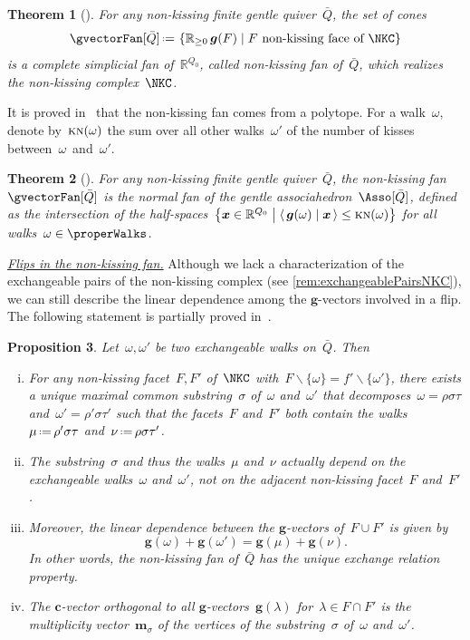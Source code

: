 \documentclass{amsart}
\newtheorem{theorem}{Theorem}[section]
\newtheorem{proposition}[theorem]{Proposition}
\theoremstyle{definition}
\newcommand{\R}{\mathbb{R}} %
\renewcommand{\b}[1]{{\boldsymbol{#1}}} %
\newcommand{\set}[2]{\left\{ #1 \;\middle|\; #2 \right\}} %
\newcommand{\ssm}{\smallsetminus} %
\newcommand{\dotprod}[2]{\left\langle \, #1 \; \middle| \; #2 \, \right\rangle} %
\newcommand{\eqdef}{\mbox{\,\raisebox{0.2ex}{\scriptsize\ensuremath{\mathrm:}}\ensuremath{=}\,}} %
\newcommand{\darkblue}{\color{darkblue}} %
\newcommand{\defn}[1]{\textsl{\darkblue #1}} %
\newcommand{\para}[1]{\medskip\noindent\uline{\textit{#1.}}} %
\newcommand{\multiplicityVector}{\b{m}} %
\newcommand{\gvector}[1]{\b{g}(#1)} %
\newcommand{\gvectors}[1]{\b{g}(#1)} %
\newcommand{\quiver}{\bar Q} %
\newcommand{\KN}{\textsc{kn}} %
\begin{document}
\begin{theorem}[{\cite[Thm.~4.17]{PaluPilaudPlamondon-nonkissing}}]
For any non-kissing finite gentle quiver~$\quiver$, the set of cones
\[
\gvectorFan[\quiver] \eqdef \set{\R_{\ge 0} \, \gvectors{F}}{F \text{ non-kissing face of } \NKC}
\]
is a complete simplicial fan of~$\R^{Q_0}$, called \defn{non-kissing fan} of~$\quiver$, which realizes the non-kissing complex~$\NKC$.
\end{theorem}

It is proved in~\cite[Thm.~4.27]{PaluPilaudPlamondon-nonkissing} that the non-kissing fan comes from a polytope.
For a walk~$\omega$, denote by~$\KN(\omega)$ the sum over all other walks~$\omega'$ of the number of kisses between~$\omega$~and~$\omega'$.

\begin{theorem}[{\cite[Thm.~4.27]{PaluPilaudPlamondon-nonkissing}}]
For any non-kissing finite gentle quiver~$\quiver$, the non-kissing fan~$\gvectorFan[\quiver]$ is the normal fan of the gentle associahedron~$\Asso[\quiver]$, defined as the intersection of the half-spaces~$\set{\b{x} \in \R^{Q_0}}{\dotprod{\gvector{\omega}}{\b{x}} \le \KN(\omega)}$ for all walks~$\omega \in \properWalks$.
\end{theorem}

\para{Flips in the non-kissing fan}
%
Although we lack a characterization of the exchangeable pairs of the non-kissing complex (see \cref{rem:exchangeablePairsNKC}), we can still describe the linear dependence among the $\b{g}$-vectors involved in a flip.
The following statement is partially proved in~\cite[Thm.~4.17]{PaluPilaudPlamondon-nonkissing}.

\begin{proposition}
\label{prop:exchangeablePairsNKC}
Let~$\omega, \omega'$ be two exchangeable walks on~$\quiver$. Then
\begin{enumerate}[(i)]
\item For any non-kissing facet~$F, F'$ of~$\NKC$ with~$F \ssm \{\omega\} = f' \ssm \{\omega'\}$, there exists a unique maximal common substring~$\sigma$ of~$\omega$ and~$\omega'$ that decomposes~$\omega = \rho \sigma \tau$ and~$\omega' = \rho' \sigma \tau'$ such that the facets~$F$ and~$F'$ both contain the walks~$\mu \eqdef \rho' \sigma \tau$ and~$\nu \eqdef \rho \sigma \tau'$.
\item The substring~$\sigma$ and thus the walks~$\mu$ and~$\nu$ actually depend on the exchangeable walks~$\omega$ and~$\omega'$, not on the adjacent non-kissing facet~$F $ and~$F'$.
\item Moreover, the linear dependence between the $\b{g}$-vectors of~$F \cup F'$ is given by
\[
\gvector{\omega} + \gvector{\omega'} = \gvector{\mu} + \gvector{\nu}.
\]
In other words, the non-kissing fan of~$\quiver$ has the unique exchange relation property.
\item The $\b{c}$-vector orthogonal to all $\b{g}$-vectors~$\gvector{\lambda}$ for~$\lambda \in F \cap F'$ is the multiplicity vector~$\multiplicityVector_{\sigma}$ of the vertices of the substring~$\sigma$ of~$\omega$ and~$\omega'$.
\end{enumerate}
\end{proposition}
\end{document}
